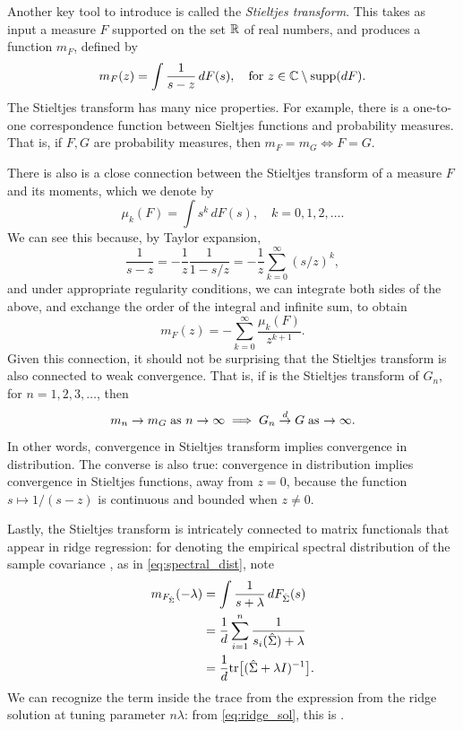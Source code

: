 \documentclass{article}
\begin{document}
Another key tool to introduce is called the \emph{Stieltjes transform}. This
takes as input a measure $F$ supported on the set $\mathbb{R}$ of real numbers, and 
produces a function $m_F$, defined by   
\begin{equation}
\label{eq:stieltjes}
m_F(z) = \int \frac{1}{s - z} \, dF(s), \quad \text{for $z \in \mathbb{C} \setminus
  \mathrm{supp}(dF)$}.  
\end{equation}
The Stieltjes transform has many nice properties. For example, there is a
one-to-one correspondence function between Sieltjes functions and probability
measures. That is, if $F,G$ are probability measures, then $m_F = m_G \iff F =
G$.  

There is also is a close connection between the Stieltjes transform of a measure
$F$ and its moments, which we denote by
\[
\mu_k(F) = \int s^k \, dF(s), \quad k=0,1,2,\dots.
\]
We can see this because, by Taylor expansion,
\[
\frac{1}{s - z} = -\frac{1}{z} \frac{1}{1 - s/z} = -\frac{1}{z}
\sum_{k=0}^\infty (s/z)^k, 
\]
and under appropriate regularity conditions, we can integrate both sides of the
above, and exchange the order of the integral and infinite sum, to obtain 
\[
m_F(z) = - \sum_{k=0}^\infty \frac{\mu_k(F)}{z^{k+1}}. 
\]
Given this connection, it should not be surprising that the Stieltjes
transform is also connected to weak convergence. That is, if  is the Stieltjes transform of $G_n$, for $n=1,2,3,\dots$, then  
\[
m_n \to m_G \; \text{as $n \to \infty$} \implies G_n \overset{d}{\to} G \; \text{as $\to
  \infty$}.  
\]
In other words, convergence in Stieltjes transform implies convergence in 
distribution. The converse is also true: convergence in distribution implies
convergence in Stieltjes functions, away from $z=0$, because the function $s
\mapsto 1/(s-z)$ is continuous and bounded when $z \not= 0$.     

Lastly, the Stieltjes transform is intricately connected to matrix functionals
that appear in ridge regression: for  denoting the
empirical spectral distribution of the sample covariance , as in \eqref{eq:spectral_dist}, note 
\begin{align*}
m_{F_{\hat\Sigma}}(-\lambda) 
&= \int \frac{1}{s+\lambda} \, dF_{\hat\Sigma} (s) \\
&= \frac{1}{d} \sum_{i=1}^n \frac{1}{s_i(\hat\Sigma) + \lambda} \\ 
&= \frac{1}{d} \mathrm{tr}\big[ (\hat\Sigma + \lambda I)^{-1} \big].
\end{align*}
We can recognize the term inside the trace from the expression from the ridge
solution at tuning parameter $n\lambda$: from \eqref{eq:ridge_sol}, this is
.
\end{document}
